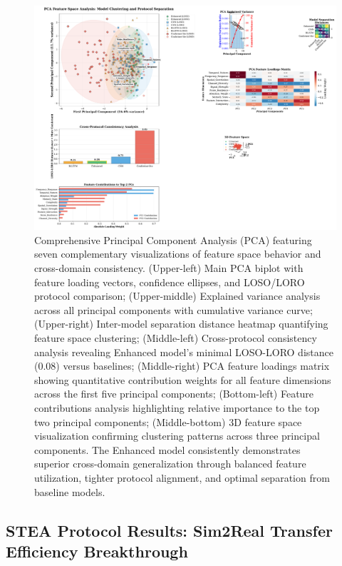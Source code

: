 \documentclass[journal]{IEEEtran}
\begin{document}
\begin{figure}[ht]
\centering
\includegraphics[width=\columnwidth]{figures/figure7_pca_analysis.pdf}
\caption{Comprehensive Principal Component Analysis (PCA) featuring seven complementary visualizations of feature space behavior and cross-domain consistency. (Upper-left) Main PCA biplot with feature loading vectors, confidence ellipses, and LOSO/LORO protocol comparison; (Upper-middle) Explained variance analysis across all principal components with cumulative variance curve; (Upper-right) Inter-model separation distance heatmap quantifying feature space clustering; (Middle-left) Cross-protocol consistency analysis revealing Enhanced model's minimal LOSO-LORO distance (0.08) versus baselines; (Middle-right) PCA feature loadings matrix showing quantitative contribution weights for all feature dimensions across the first five principal components; (Bottom-left) Feature contributions analysis highlighting relative importance to the top two principal components; (Middle-bottom) 3D feature space visualization confirming clustering patterns across three principal components. The Enhanced model consistently demonstrates superior cross-domain generalization through balanced feature utilization, tighter protocol alignment, and optimal separation from baseline models.}
\label{fig:pca_analysis}
\end{figure}

\subsection{STEA Protocol Results: Sim2Real Transfer Efficiency Breakthrough}
\end{document}
